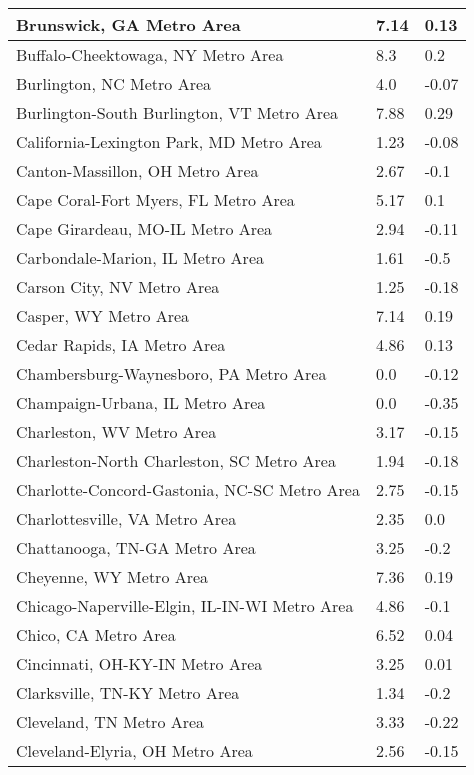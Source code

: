 \documentclass[12pt,oneside, letterpaper]{book}
\begin{document}
\begin{longtable}{| p{} | p{} | p{} |}
    Brunswick, GA Metro Area & 7.14 & 0.13 \\ \hline
    Buffalo-Cheektowaga, NY Metro Area & 8.3 & 0.2 \\ \hline
    Burlington, NC Metro Area & 4.0 & -0.07 \\ \hline
    Burlington-South Burlington, VT Metro Area & 7.88 & 0.29 \\ \hline
    California-Lexington Park, MD Metro Area & 1.23 & -0.08 \\ \hline
    Canton-Massillon, OH Metro Area & 2.67 & -0.1 \\ \hline
    Cape Coral-Fort Myers, FL Metro Area & 5.17 & 0.1 \\ \hline
    Cape Girardeau, MO-IL Metro Area & 2.94 & -0.11 \\ \hline
    Carbondale-Marion, IL Metro Area & 1.61 & -0.5 \\ \hline
    Carson City, NV Metro Area & 1.25 & -0.18 \\ \hline
    Casper, WY Metro Area & 7.14 & 0.19 \\ \hline
    Cedar Rapids, IA Metro Area & 4.86 & 0.13 \\ \hline
    Chambersburg-Waynesboro, PA Metro Area & 0.0 & -0.12 \\ \hline
    Champaign-Urbana, IL Metro Area & 0.0 & -0.35 \\ \hline
    Charleston, WV Metro Area & 3.17 & -0.15 \\ \hline
    Charleston-North Charleston, SC Metro Area & 1.94 & -0.18 \\ \hline
    Charlotte-Concord-Gastonia, NC-SC Metro Area & 2.75 & -0.15 \\ \hline
    Charlottesville, VA Metro Area & 2.35 & 0.0 \\ \hline
    Chattanooga, TN-GA Metro Area & 3.25 & -0.2 \\ \hline
    Cheyenne, WY Metro Area & 7.36 & 0.19 \\ \hline
    Chicago-Naperville-Elgin, IL-IN-WI Metro Area & 4.86 & -0.1 \\ \hline
    Chico, CA Metro Area & 6.52 & 0.04 \\ \hline
    Cincinnati, OH-KY-IN Metro Area & 3.25 & 0.01 \\ \hline
    Clarksville, TN-KY Metro Area & 1.34 & -0.2 \\ \hline
    Cleveland, TN Metro Area & 3.33 & -0.22 \\ \hline
    Cleveland-Elyria, OH Metro Area & 2.56 & -0.15 \\ \hline

\end{longtable}
\end{document}
